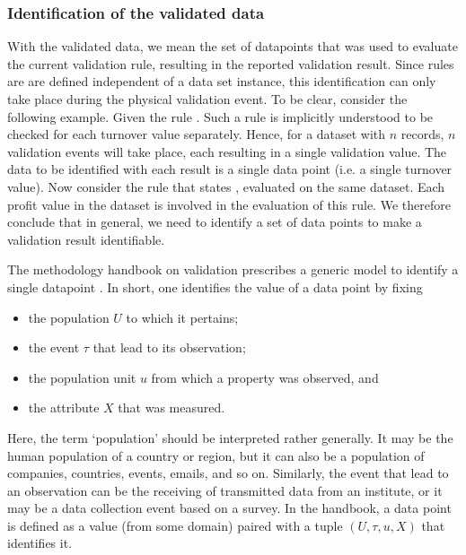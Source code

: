\subsubsection{Identification of the validated data}
\label{sect:iddata}
With the validated data, we mean the set of datapoints that was used to
evaluate the current validation rule, resulting in the reported validation
result. Since rules are are defined independent of a data set instance, this
identification can only take place during the physical validation event. To be
clear, consider the following example. Given the rule .
Such a rule is implicitly understood to be checked for each turnover value
separately. Hence, for a dataset with $n$ records, $n$ validation events will
take place, each resulting in a single validation value. The data to be
identified with each result is a single data point (i.e. a single turnover
value). Now consider the rule that states , evaluated on
the same dataset. Each profit value in the dataset is involved in the
evaluation of this rule. We therefore conclude that in general, we need to
identify a set of data points to make a validation result identifiable.


The methodology handbook on validation prescribes a generic model to 
identify a single datapoint \citep[Chapter~5]{zio2015methodology}. In short,
one identifies the value of a data point by fixing
\begin{itemize}
\item the population $U$ to which it pertains;
\item the event $\tau$ that lead to its observation;
\item the population unit $u$ from which a property was observed, and
\item the attribute $X$ that was measured.
\end{itemize}
Here, the term `population' should be interpreted rather generally. It may be
the human population of a country or region, but it can also be a population of
companies, countries, events, emails, and so on. Similarly, the event that lead
to an observation can be the receiving of transmitted data from an institute,
or it may be a data collection event based on a survey.  In the handbook, a
data point is defined as a value (from some domain) paired with a tuple
$(U,\tau,u,X)$ that identifies it.




